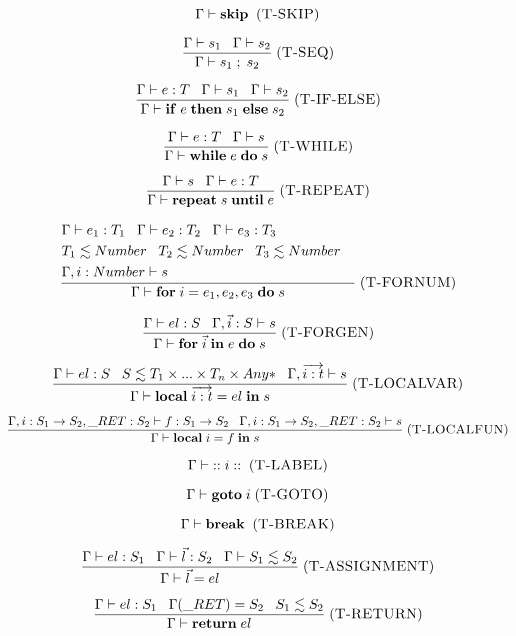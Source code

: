 \documentclass[12pt]{article}
\newcommand{\mylabel}[1]{\; (\textsc{#1})}
\newcommand{\kw}[1]{\mathbf{#1} \;}
\newcommand{\env}{\Gamma}
\newcommand{\ret}{\string_RET}
\begin{document}
\[
\env \vdash \kw{skip}
\mylabel{T-SKIP}
\]

\[
\frac{\env \vdash s_{1} \;\;\;
      \env \vdash s_{2}}
     {\env \vdash s_{1} \;;\; s_{2}}
\mylabel{T-SEQ}
\]

\[
\frac{\env \vdash e:T \;\;\;
      \env \vdash s_{1} \;\;\;
      \env \vdash s_{2}}
     {\env \vdash \kw{if} e \; \kw{then} s_{1} \; \kw{else} s_{2}}
\mylabel{T-IF-ELSE}
\]

\[
\frac{\env \vdash e:T \;\;\;
      \env \vdash s}
     {\env \vdash \kw{while} e \; \kw{do} s}
\mylabel{T-WHILE}
\]

\[
\frac{\env \vdash s \;\;\;
      \env \vdash e:T}
     {\env \vdash \kw{repeat} s \; \kw{until} e}
\mylabel{T-REPEAT}
\]

\[
\frac{\begin{aligned}
      & \env \vdash e_{1}:T_{1} \;\;\;
        \env \vdash e_{2}:T_{2} \;\;\;
        \env \vdash e_{3}:T_{3} &\\
      & T_{1} \lesssim Number \;\;\;
        T_{2} \lesssim Number \;\;\;
        T_{3} \lesssim Number &\\
      & \env, i:Number \vdash s &
      \end{aligned}}
     {\env \vdash \kw{for} i=e_{1},e_{2},e_{3} \; \kw{do} s}
\mylabel{T-FORNUM}
\]

\[
\frac{\env \vdash el:S \;\;\;
      \env, \vec{i}:S \vdash s}
     {\env \vdash \kw{for} \vec{i} \; \kw{in} e \; \kw{do} s}
\mylabel{T-FORGEN}
\]

\[
\frac{\env \vdash el:S \;\;\;
      S \lesssim T_{1} \times ... \times T_{n} \times {Any*} \;\;\;
      \env, \overrightarrow{i:t} \vdash s}
     {\env \vdash \kw{local} \overrightarrow{i:t} = el \; \kw{in} s}
\mylabel{T-LOCALVAR}
\]

\[
\frac{\env, i:S_{1} \rightarrow S_{2}, \ret:S_{2} \vdash f:S_{1} \rightarrow S_{2} \;\;\;
      \env, i:S_{1} \rightarrow S_{2}, \ret:S_{2} \vdash s}
     {\env \vdash \kw{local} i = f \; \kw{in} s}
\mylabel{T-LOCALFUN}
\]

\[
\env \vdash \kw{::} i \; \kw{::}
\mylabel{T-LABEL}
\]

\[
\env \vdash \kw{goto} i
\mylabel{T-GOTO}
\]

\[
\env \vdash \kw{break}
\mylabel{T-BREAK}
\]

\[
\frac{\env \vdash el:S_{1} \;\;\;
      \env \vdash \vec{l}:S_{2} \;\;\;
      \env \vdash S_{1} \lesssim S_{2}}
     {\env \vdash \vec{l} = el}
\mylabel{T-ASSIGNMENT}
\]

\[
\frac{\env \vdash el:S_{1} \;\;\;
      \env(\ret) = S_{2} \;\;\;
      S_{1} \lesssim S_{2}}
     {\env \vdash \kw{return} el}
\mylabel{T-RETURN}
\]
\end{document}
